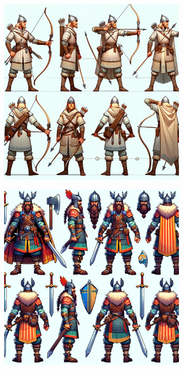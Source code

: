 \documentclass[a4paper,10pt,english]{article}
\begin{document}
\begin{figure}[h]

\centering

\begin{subfigure}{0.29\linewidth}
\includegraphics[width=\linewidth]{archers.png}
\label{Fig:Style1A}
\end{subfigure}\hfill
%
\begin{subfigure}{0.29\linewidth}
\includegraphics[width=\linewidth]{swordsman.png}

\end{subfigure}
\end{figure}
\end{document}
